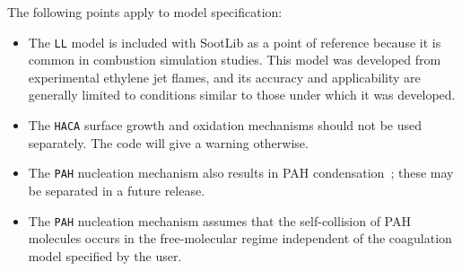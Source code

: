 \documentclass[preprint,letterpaper]{elsarticle}
\begin{document}
The following points apply to model specification:
\begin{itemize}
\item The \texttt{LL} model is included with SootLib as a point of reference because it is common in combustion simulation studies. This model was developed from experimental ethylene jet flames, and its accuracy and applicability are generally limited to conditions similar to those under which it was developed.
\item The \texttt{HACA} surface growth and oxidation mechanisms should not be used separately. The code will give a warning otherwise. %
\item The \texttt{PAH} nucleation mechanism also results in PAH condensation~\cite{Blanquart_2009c}; these may be separated in a future release.
\item The \texttt{PAH} nucleation mechanism assumes that the self-collision of PAH molecules occurs in the free-molecular regime independent of the coagulation model specified by the user. %
\end{itemize}
%

\end{document}
